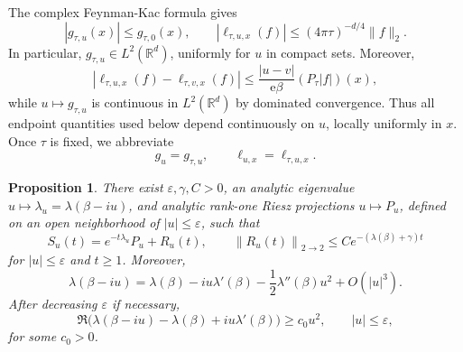 \documentclass[11pt,reqno]{amsart}
\newtheorem{proposition}[theorem]{Proposition}
\theoremstyle{definition}
\numberwithin{equation}{section}
\newcommand{\<}{\langle}
\renewcommand{\>}{\rangle}
\def\lt{\left}
\def\rt{\right}
\newcommand{\norm}[1]{{\lt\|#1\rt\|}}
\begin{document}
The complex Feynman-Kac formula gives
\[|g_{\tau,u}(x)|\leq g_{\tau,0}(x),\qquad|\ell_{\tau,u,x}(f)|\leq(4\pi\tau)^{-d/4}\|f\|_2.\]
In particular,  $g_{\tau,u}\in L^2(\mathbb R^d) $, uniformly for  $u $ in compact sets. Moreover,
\[\left|\ell_{\tau,u,x}(f)-\ell_{\tau,v,x}(f)\right|\leq\frac{|u-v|}{\mathrm e\beta}\left(P_\tau|f|\right)(x),\]
while  $u\mapsto g_{\tau,u} $ is continuous in  $L^2(\mathbb R^d) $ by dominated convergence. Thus all endpoint quantities used below depend continuously on  $u $, locally uniformly in  $x $. Once  $\tau $ is fixed, we abbreviate
\[g_u=g_{\tau,u},\qquad\ell_{u,x}=\ell_{\tau,u,x}.\]
\begin{proposition}
\label{prop:analytic-band}
There exist $\varepsilon,\gamma,C>0$, an analytic eigenvalue
$u\mapsto\lambda_u =\lambda(\beta-iu)$, and analytic rank-one Riesz
projections $u\mapsto P_u$, defined on an open neighborhood of $|u|\le\varepsilon$, such that
\begin{equation}
 S_u(t)=e^{-t\lambda_u}P_u+R_u(t),
 \qquad
 \norm{R_u(t)}_{2\to2}
 \leq Ce^{-(\lambda (\beta)+\gamma)t}
 \label{eq:local-spectral-decomposition}
\end{equation}
for $|u|\leq\varepsilon$ and $t\geq1$.  Moreover,
\begin{equation}
 \lambda(\beta-iu)
 =\lambda (\beta)-iu \lambda'(\beta)
  -\frac12 \lambda''(\beta) u^2+O(|u|^3).
 \label{eq:lambda-expansion}
\end{equation}
After decreasing $\varepsilon$ if necessary,
\begin{equation}
 \Re\bigl(\lambda(\beta-iu)-\lambda(\beta)+iu \lambda'(\beta)\bigr)
 \geq c_0u^2,
 \qquad |u|\leq\varepsilon,
 \label{eq:quadratic-real-part}
\end{equation}
for some $c_0>0$.
\end{proposition}
\end{document}
